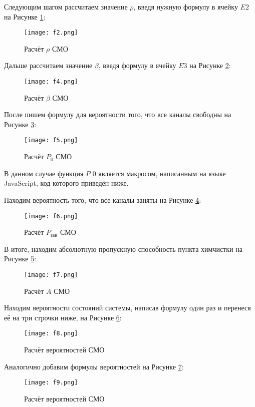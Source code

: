 \documentclass[14pt]{extarticle}
\begin{document}
    Следующим шагом рассчитаем значение $\rho$, введя нужную формулу в ячейку $E2$ на Рисунке \ref{fig:rho}:
    \begin{figure}[!ht]
        \centering
        \texttt{[image: f2.png]}
        \caption{Расчёт $\rho$ СМО}
        \label{fig:rho}
    \end{figure}

    Дальше рассчитаем значение $\beta$, введя формулу в ячейку $E3$ на Рисунке \ref{fig:beta}:
    \begin{figure}[!ht]
        \centering
        \texttt{[image: f4.png]}
        \caption{Расчёт $\beta$ СМО}
        \label{fig:beta}
    \end{figure}

    После пишем формулу для вероятности того, что все каналы свободны на Рисунке \ref{fig:p_0}:
    \begin{figure}[!ht]
        \centering
        \texttt{[image: f5.png]}
        \caption{Расчёт $P_0$ СМО}
        \label{fig:p_0}
    \end{figure}

    В данном случае функция $P\_0$ является макросом, написанным на языке JavaScript, код которого приведён ниже.

    Находим вероятность того, что все каналы заняты на Рисунке \ref{fig:p_b}:
    \begin{figure}[!ht]
        \centering
        \texttt{[image: f6.png]}
        \caption{Расчёт $P_\text{зан}$ СМО}
        \label{fig:p_b}
    \end{figure}

    В итоге, находим абсолютную пропускную способность пункта химчистки на Рисунке \ref{fig:a}:
    \begin{figure}[!ht]
        \centering
        \texttt{[image: f7.png]}
        \caption{Расчёт $A$ СМО}
        \label{fig:a}
    \end{figure}

    Находим вероятности состояний системы, написав формулу один раз и перенеся её на три строчки ниже, на Рисунке \ref{fig:P_k}:
    \begin{figure}[!ht]
        \centering
        \texttt{[image: f8.png]}
        \caption{Расчёт вероятностей СМО}
        \label{fig:P_k}
    \end{figure}

    Аналогично добавим формулы вероятностей на Рисунке \ref{fig:p_k}:
    \begin{figure}[!ht]
        \centering
        \texttt{[image: f9.png]}
        \caption{Расчёт вероятностей СМО}
        \label{fig:p_k}
    \end{figure}
\end{document}
